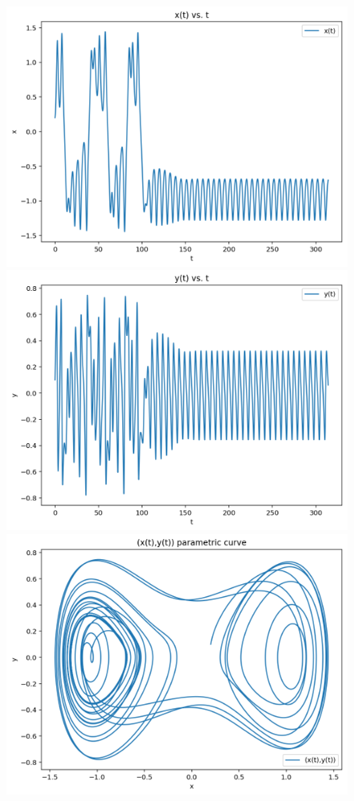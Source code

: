 \documentclass{article}
\begin{document}
\begin{figure}[h!]
\includegraphics[scale=0.4]{x(t)4.png}
\includegraphics[scale=0.4]{y(t)4.png}
\includegraphics[scale=0.4]{parametriccurve4.png}

\end{figure}
\end{document}
